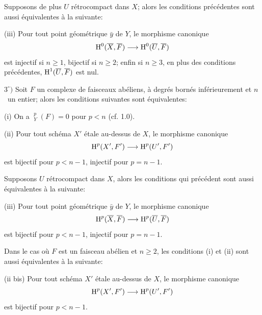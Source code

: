\begin{proposition}
Supposons de plus $U$ r\'etrocompact dans $X$; alors les conditions pr\'ec\'edentes sont aussi \'equivalentes \`a la suivante:

\textup{(iii)} Pour tout point g\'eom\'etrique $\bar{y}$ de $Y$, le morphisme canonique
$$
\H^0(\bar{X}, \bar{F})\to \H^0(\bar{U}, \bar{F})
$$
est injectif si $n\geq 1$, bijectif si $n\geq 2$; enfin si $n\geq 3$, en plus des conditions pr\'ec\'edentes, $\operatorname{H}^1(\overline{U}, \overline{F})$ est nul.

$3^\circ)$ Soit $F$ un complexe de faisceaux ab\'eliens, \`a degr\'es born\'es inf\'erieurement et $n$~un entier; alors les conditions suivantes sont \'equivalentes:

\textup{(i)} On a ${\mathop{\underline{\mathrm{H}}}\nolimits}_Y^p(F)=0$ pour $p<n$ (cf. 1.0).

\textup{(ii)} Pour tout sch\'ema $X'$ \'etale au-dessus de $X$, le morphisme canonique
$$
\H^p(X', F')\to \H^p(U', F')
$$
est bijectif pour $p<n-1$, injectif pour $p=n-1$.

Supposons $U$ r\'etrocompact dans $X$, alors les conditions qui pr\'ec\'edent sont aussi \'equivalentes \`a la suivante:

\textup{(iii)} Pour tout point g\'eom\'etrique $\bar{y}$ de $Y$, le morphisme canonique
$$
\H^p(\bar{X}, \bar{F})\to \H^p(\bar{U}, \bar{F})$$
est bijectif pour $p<n-1$, injectif pour $p=n-1$.

Dans le cas o\`u $F$ est un faisceau ab\'elien et $n\geq 2$, les conditions \textup{(i)} et \textup{(ii)} sont aussi \'equivalentes \`a la suivante:

\textup{(ii bis)} Pour tout sch\'ema $X'$ \'etale au-dessus de $X$, le morphisme canonique
$$
\H^p(X', F')\to \H^p(U', F')$$
est bijectif pour $p<n-1$.
\end{proposition}

